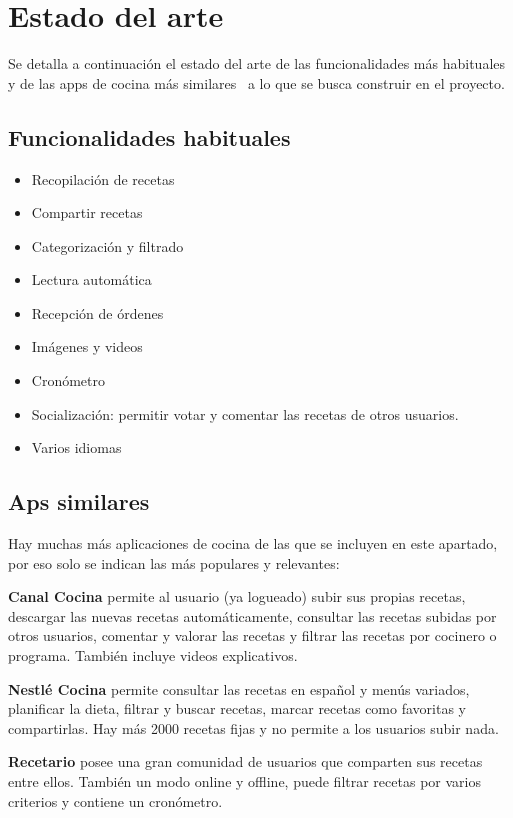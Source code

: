 \section{Estado del arte}
\label{sec:estado-del-arte}

Se detalla a continuación el estado del arte de las funcionalidades más
habituales y de las apps de cocina más similares~\cite{mejores-apps-cocina}
a lo que se busca construir en el proyecto.

\subsection{Funcionalidades habituales}

\begin{itemize}
\item Recopilación de recetas
\item Compartir recetas
\item Categorización y filtrado
\item Lectura automática
\item Recepción de órdenes
\item Imágenes y videos
\item Cronómetro
\item Socialización: permitir votar y comentar las recetas de otros usuarios.
\item Varios idiomas
\end{itemize}

\subsection{Aps similares}

Hay muchas más aplicaciones de cocina de las que se incluyen en este apartado,
por eso solo se indican las más populares y relevantes:

\textbf{Canal Cocina} permite al usuario (ya logueado) subir sus propias
recetas, descargar las nuevas recetas automáticamente, consultar las recetas
subidas por otros usuarios, comentar y valorar las recetas y filtrar las
recetas por cocinero o programa. También incluye videos explicativos.

\textbf{Nestlé Cocina} permite consultar las recetas en español y menús variados,
planificar la dieta, filtrar y buscar recetas, marcar recetas como favoritas
y compartirlas. Hay más 2000 recetas fijas y no permite a los usuarios subir
nada.

\textbf{Recetario} posee una gran comunidad de usuarios que comparten sus
recetas entre ellos. También un modo online y offline, puede filtrar recetas
por varios criterios y contiene un cronómetro.

